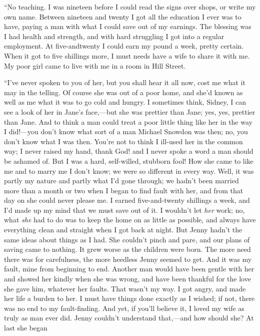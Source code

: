 ``No teaching. I was nineteen before I could read the signs over shops,
or write my own name. Between nineteen and twenty I got all the
education I ever was to have, paying a man with what I could save out of
my earnings. The blessing was I had health and strength, and with hard
struggling I got into a regular employment. At five-andtwenty I could
earn my pound a week, pretty certain. When it got to five shillings
more, I must needs have a wife to share it with me. My poor girl came to
live with me in a room in Hill Street.

``I've never spoken to you of her, but you
{\protect\hypertarget{132}{}{}}shall hear it all now, cost me what it
may in the telling. Of course she was out of a poor home, and she'd
known as well as me what it was to go cold and hungry. I sometimes
think, Sidney, I can see a look of her in Jane's face,---but she was
prettier than Jane; yes, yes, prettier than Jane. And to think a man
could treat a poor little thing like her in the way I did!---you don't
know what sort of a man Michael Snowdon was then; no, you don't know
what I was then. You're not to think I ill-used her in the common way; I
never raised my hand, thank God! and I never spoke a word a man should
be ashamed of. But I was a hard, self-willed, stubborn fool! How she
came to like me and to marry me I don't know; we were so different in
every way. Well, it was partly my nature and partly what I'd gone
through; we hadn't been married more than a month or two when I began to
find fault with her, and from that day on she could never please me. I
earned five-and-twenty shillings a week, and I'd made up my mind that we
must save out of it. {\protect\hypertarget{133}{}{}}I wouldn't let
\emph{her} work; no, what \emph{she} had to do was to keep the home on
as little as possible, and always have everything clean and straight
when I got back at night. But Jenny hadn't the same ideas about things
as I had. She couldn't pinch and pare, and our plans of saving came to
nothing. It grew worse as the children were born. The more need there
was for carefulness, the more heedless Jenny seemed to get. And it was
my fault, mine from beginning to end. Another man would have been gentle
with her and showed her kindly when she was wrong, and have been
thankful for the love she gave him, whatever her faults. That wasn't my
way. I got angry, and made her life a burden to her. I must have things
done exactly as I wished; if not, there was no end to my fault-finding.
And yet, if you'll believe it, I loved my wife as truly as man ever did.
Jenny couldn't understand that,---and how should she? At last she began
